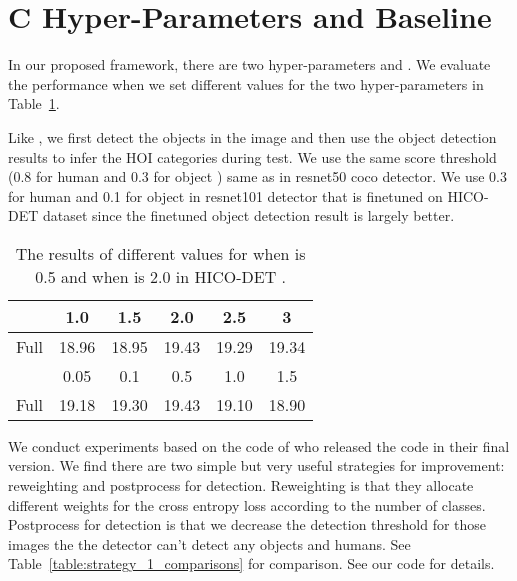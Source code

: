 \documentclass[runningheads]{llncs}
\begin{document}
\section*{C Hyper-Parameters and Baseline}
\label{sec:hyper-param}

In our proposed framework, there are two hyper-parameters  and .
We evaluate the performance when we set different values for the two hyper-parameters in Table~\ref{table:lambda_1_comparisons}.

Like \cite{gao2018ican, li2018transferable}, we first detect the objects in the image and then use the object detection results to infer the HOI categories during test. We use the same score threshold (0.8 for human and 0.3 for object ) same as \cite{li2018transferable} in resnet50 coco detector. We use 0.3 for human and 0.1 for object in resnet101 detector that is finetuned on HICO-DET dataset since the finetuned object detection result is largely better.


\begin{table}
\begin{center}
\caption{The results of different values for  when  is 0.5 and  when  is 2.0 in HICO-DET .
}
\label{table:lambda_1_comparisons}
\small
\begin{tabular}{lccccc}
\hline
 & 1.0 & 1.5 & 2.0 & 2.5 & 3 \\
\hline\hline
Full & 18.96 & 18.95 & 19.43 & 19.29 & 19.34 \\
\hline\hline
  & 0.05 & 0.1 & 0.5 & 1.0 & 1.5 \\
\hline
Full & 19.18 & 19.30 & 19.43 & 19.10 & 18.90 \\
\hline
\end{tabular}
\end{center}
\end{table}


We conduct experiments based on the code of \cite{li2018transferable} who released the code in their final version. We find there are two simple but very useful strategies for improvement: reweighting and postprocess for detection. Reweighting is that they allocate different weights for the cross entropy loss according to the number of classes. Postprocess for detection is that we decrease the detection threshold for those images the the detector can't detect any objects and humans. See Table~\ref{table:strategy_1_comparisons} for comparison. See our code for details.
\end{document}
